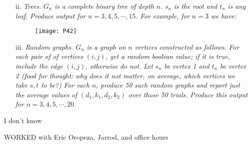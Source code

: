 \documentclass[12pt]{article} \setlength{\oddsidemargin}{0in}
\begin{document}
\begin{enumerate}
{\begin{enumerate}
\begin{figure}[h]
  \centering \texttt{[image: P41]}
\end{figure}

\textit{Produce output for $n = 3, 4, 5, \cdots, 20$.}

\item[ii.] \textit{Trees. $G_n$ is a complete binary tree of depth $n$. $s_n$ is the root and $t_n$ is any leaf. Produce output for $n = 3, 4, 5, \cdots, 15$. For example, for $n = 3$ we have:}

  \begin{figure}[H]
  \centering \texttt{[image: P42]}
  \end{figure}

\item[iii.] \textit{Random graphs. $G_n$ is a graph on $n$ vertices constructed as follows. For each
pair of of vertices $(i, j)$, get a random boolean value; if it is true, include
the edge $(i, j)$, otherwise do not. Let $s_n$ be vertex 1 and $t_n$ be vertex 2 (food
for thought: why does it not matter, on average, which vertices we take $s, t$
to be?) For each $n$, produce 50 such random graphs and report just the
average values of $(d_1, k_ 1, d_2, k_2 )$ over those 50 trials. Produce this output for $n = 3, 4, 5, \cdots, 20$.}
    \end{enumerate}
  }

  I don't know 

\end{enumerate}


WORKED with Eric Oropeza, Jarrod, and office hours


\end{document}
